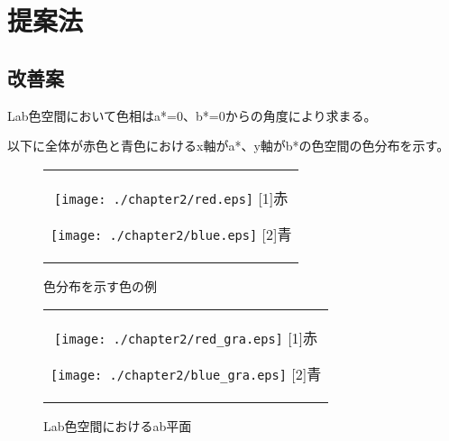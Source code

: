 \chapter{提案法}

\section{改善案}
Lab色空間において色相はa*=0、b*=0からの角度により求まる。\par
以下に全体が赤色と青色におけるx軸がa*、y軸がb*の色空間の色分布を示す。\par
\begin{figure}[htbp]
  \begin{center}
    \begin{tabular}{c}

      \begin{minipage}{0.33\hsize}
        \begin{center}
          \texttt{[image: ./chapter2/red.eps]}
          \hspace{1.6cm} [1]赤
        \end{center}
      \end{minipage}

      \begin{minipage}{0.33\hsize}
        \begin{center}
          \texttt{[image: ./chapter2/blue.eps]}
          \hspace{1.6cm} [2]青
        \end{center}
      \end{minipage}

    \end{tabular}
    \caption{色分布を示す色の例}
    \label{fig:color}
  \end{center}
\end{figure}

\newpage
\begin{figure}[htbp]
  \begin{center}
    \begin{tabular}{c}

      \begin{minipage}{0.33\hsize}
        \begin{center}
          \texttt{[image: ./chapter2/red\_gra.eps]}
          \hspace{1.6cm} [1]赤
        \end{center}
      \end{minipage}

      \begin{minipage}{0.33\hsize}
        \begin{center}
          \texttt{[image: ./chapter2/blue\_gra.eps]}
          \hspace{1.6cm} [2]青
        \end{center}
      \end{minipage}

    \end{tabular}
    \caption{Lab色空間におけるab平面}
    \label{fig:color_gra}
  \end{center}
\end{figure}

